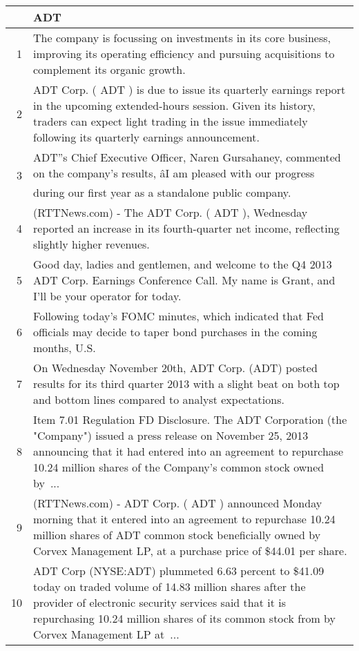 \documentclass{tufte-handout}\usepackage[]{graphicx}\usepackage[]{color}
\begin{document}
\begin{tabularx}{\textwidth}{rX}
  \hline
 & ADT \\ 
  \hline
1 &  The company is focussing on investments in its core business, improving its operating efficiency and pursuing acquisitions to complement its organic growth.  \\ 
  2 &  ADT Corp. ( ADT ) is due to issue its quarterly earnings report in the upcoming extended-hours session. Given its history, traders can expect light trading in the issue immediately following its quarterly earnings announcement.  \\ 
  3 &  ADT''s Chief Executive Officer, Naren Gursahaney, commented on the company's results, âI am pleased with our progress during our first year as a standalone public company.  \\ 
  4 &  (RTTNews.com) - The ADT Corp. ( ADT ), Wednesday reported an increase in its fourth-quarter net income, reflecting slightly higher revenues.  \\ 
  5 &  Good day, ladies and gentlemen, and welcome to the Q4 2013 ADT Corp. Earnings Conference Call. My name is Grant, and I'll be your operator for today.  \\ 
  6 &  Following today's FOMC minutes, which indicated that Fed officials may decide to taper bond purchases in the coming months, U.S.  \\ 
  7 &  On Wednesday November 20th, ADT Corp. (ADT) posted results for its third quarter 2013 with a slight beat on both top and bottom lines compared to analyst expectations.  \\ 
  8 &  Item 7.01 Regulation FD Disclosure. The ADT Corporation (the "Company") issued a press release on November 25, 2013 announcing that it had entered into an agreement to repurchase 10.24 million shares of the Company's common stock owned by ...  \\ 
  9 &  (RTTNews.com) - ADT Corp. ( ADT ) announced Monday morning that it entered into an agreement to repurchase 10.24 million shares of ADT common stock beneficially owned by Corvex Management LP, at a purchase price of \$44.01 per share.  \\ 
  10 &  ADT Corp (NYSE:ADT) plummeted 6.63 percent to \$41.09 today on traded volume of 14.83 million shares after the provider of electronic security services said that it is repurchasing 10.24 million shares of its common stock from by Corvex Management LP at ...  \\ 
   \hline
\end{tabularx}
\end{document}
